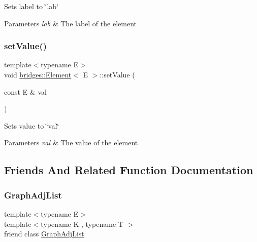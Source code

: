Sets label to \char`\"{}lab\char`\"{}


\begin{DoxyParams}{Parameters}
{\em lab} & The label of the element \\
\hline
\end{DoxyParams}
\hypertarget{classbridges_1_1_element_a737cb19281b6aa45a5a1dc9d592dad93}{}\label{classbridges_1_1_element_a737cb19281b6aa45a5a1dc9d592dad93} 
\subsubsection{\texorpdfstring{set\+Value()}{setValue()}}
{\footnotesize\ttfamily template$<$typename E$>$ \\
void \hyperlink{classbridges_1_1_element}{bridges\+::\+Element}$<$ E $>$\+::set\+Value (\begin{DoxyParamCaption}\item[{const E \&}]{val }\end{DoxyParamCaption})\hspace{0.3cm}{\ttfamily [inline]}}

Sets value to \char`\"{}val\char`\"{}


\begin{DoxyParams}{Parameters}
{\em val} & The value of the element \\
\hline
\end{DoxyParams}


\subsection{Friends And Related Function Documentation}
\hypertarget{classbridges_1_1_element_a1ec5df26ff2381673c41d5a8d1f222e2}{}\label{classbridges_1_1_element_a1ec5df26ff2381673c41d5a8d1f222e2} 
\subsubsection{\texorpdfstring{Graph\+Adj\+List}{GraphAdjList}}
{\footnotesize\ttfamily template$<$typename E$>$ \\
template$<$typename K , typename T $>$ \\
friend class \hyperlink{classbridges_1_1_graph_adj_list}{Graph\+Adj\+List}\hspace{0.3cm}{\ttfamily [friend]}}

